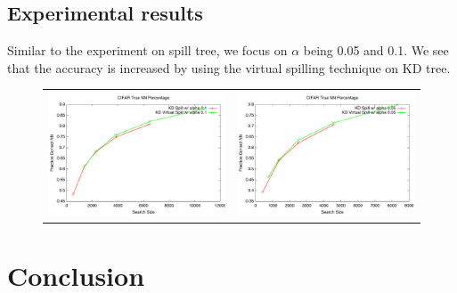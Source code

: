 \documentclass[paper=letter, fontsize=12pt]{article} %
\begin{document}
\subsection{Experimental results}
Similar to the experiment on spill tree, we focus on $\alpha$ being 0.05 and 0.1. We see that the accuracy is increased by using the virtual spilling technique on KD tree.
\begin{figure}[h]
   \centering
   \begin{tabular}{c c}
   	\includegraphics[width=.5\textwidth]{kd_vspill_vs_kd_spill_point1.pdf} &
   	\includegraphics[width=.5\textwidth]{kd_vspill_vs_kd_spill_point05.pdf} \\
   \end{tabular}
\end{figure}

\section{Conclusion}
\end{document}
